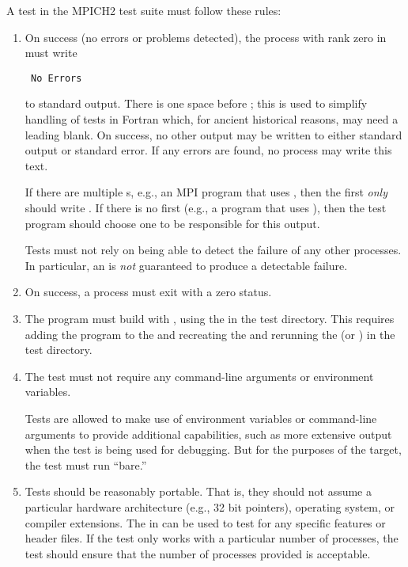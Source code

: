 A test in the MPICH2 test suite must follow these rules:
\begin{enumerate}
\item On success (no errors or problems detected), the process with
rank zero in  must write
\begin{verbatim}
 No Errors
\end{verbatim}
to standard output.  
There is one space before ; this is used to simplify handling
of tests in Fortran which, for ancient historical reasons, may need a
leading blank.  On success, no other output may be written to either
standard output or standard error.
If any errors are found, no process may write
this text.

If there are multiple s, e.g., an MPI program
that uses , then the first 
\emph{only} should write .  If there is no first
 (e.g., a program that uses
), then the test program should choose one
 to be responsible for this output.

Tests must not rely on being able to detect the failure of any other
processes.  In particular, an  is \emph{not} guaranteed to
produce a detectable failure.

\item On success, a process must exit with a zero status.

\item The program must build with , using the
 in the test directory.  This requires adding the
program to the  and recreating the
 and rerunning the  (or
) in the test directory.

\item The test must not require any command-line arguments or
environment variables.

Tests are allowed to make use of environment
variables or command-line arguments to provide additional
capabilities, such as more extensive output when the test is being
used for debugging.  But for the purposes of the 
target, the test must run ``bare.''

\item Tests should be reasonably portable.  That is, they should not
assume a particular hardware architecture (e.g., 32 bit pointers),
operating system, or compiler extensions.  The  in
 can be used to test for any specific
features or header files.  If the test only works with a particular
number of processes, the test should ensure that the number of
processes provided is acceptable.  


\end{enumerate}
